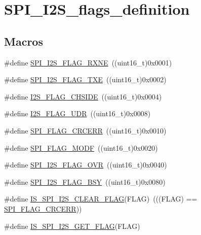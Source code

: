 \hypertarget{group___s_p_i___i2_s__flags__definition}{}\section{S\+P\+I\+\_\+\+I2\+S\+\_\+flags\+\_\+definition}
\label{group___s_p_i___i2_s__flags__definition}
\subsection*{Macros}
\begin{DoxyCompactItemize}
\item 
\#define \mbox{\hyperlink{group___s_p_i___i2_s__flags__definition_ga79ee46c44f8886193293528460fea6ed}{S\+P\+I\+\_\+\+I2\+S\+\_\+\+F\+L\+A\+G\+\_\+\+R\+X\+NE}}~((uint16\+\_\+t)0x0001)
\item 
\#define \mbox{\hyperlink{group___s_p_i___i2_s__flags__definition_ga4dbac2dc3e0cfbd7a019ebecc45d66d7}{S\+P\+I\+\_\+\+I2\+S\+\_\+\+F\+L\+A\+G\+\_\+\+T\+XE}}~((uint16\+\_\+t)0x0002)
\item 
\#define \mbox{\hyperlink{group___s_p_i___i2_s__flags__definition_gaf0d629fd522a15aff188236d3254b2ad}{I2\+S\+\_\+\+F\+L\+A\+G\+\_\+\+C\+H\+S\+I\+DE}}~((uint16\+\_\+t)0x0004)
\item 
\#define \mbox{\hyperlink{group___s_p_i___i2_s__flags__definition_gaec08a8ad716bef1b87a8c8d992ab89ec}{I2\+S\+\_\+\+F\+L\+A\+G\+\_\+\+U\+DR}}~((uint16\+\_\+t)0x0008)
\item 
\#define \mbox{\hyperlink{group___s_p_i___i2_s__flags__definition_ga30fb6af50e1f3c61cb9de76b0101c889}{S\+P\+I\+\_\+\+F\+L\+A\+G\+\_\+\+C\+R\+C\+E\+RR}}~((uint16\+\_\+t)0x0010)
\item 
\#define \mbox{\hyperlink{group___s_p_i___i2_s__flags__definition_gac7d3525ab98cc18f02270a4dba685897}{S\+P\+I\+\_\+\+F\+L\+A\+G\+\_\+\+M\+O\+DF}}~((uint16\+\_\+t)0x0020)
\item 
\#define \mbox{\hyperlink{group___s_p_i___i2_s__flags__definition_ga42001f769835f133600a021a29764254}{S\+P\+I\+\_\+\+I2\+S\+\_\+\+F\+L\+A\+G\+\_\+\+O\+VR}}~((uint16\+\_\+t)0x0040)
\item 
\#define \mbox{\hyperlink{group___s_p_i___i2_s__flags__definition_ga4551095df1365cf2a760282a34279b3c}{S\+P\+I\+\_\+\+I2\+S\+\_\+\+F\+L\+A\+G\+\_\+\+B\+SY}}~((uint16\+\_\+t)0x0080)
\item 
\#define \mbox{\hyperlink{group___s_p_i___i2_s__flags__definition_gab16c7f47712871b8f1b97de43841856f}{I\+S\+\_\+\+S\+P\+I\+\_\+\+I2\+S\+\_\+\+C\+L\+E\+A\+R\+\_\+\+F\+L\+AG}}(F\+L\+AG)~(((F\+L\+AG) == \mbox{\hyperlink{group___s_p_i___i2_s__flags__definition_ga30fb6af50e1f3c61cb9de76b0101c889}{S\+P\+I\+\_\+\+F\+L\+A\+G\+\_\+\+C\+R\+C\+E\+RR}}))
\item 
\#define \mbox{\hyperlink{group___s_p_i___i2_s__flags__definition_ga1241471a018bc63ed140089ce8334b4f}{I\+S\+\_\+\+S\+P\+I\+\_\+\+I2\+S\+\_\+\+G\+E\+T\+\_\+\+F\+L\+AG}}(F\+L\+AG)
\end{DoxyCompactItemize}



